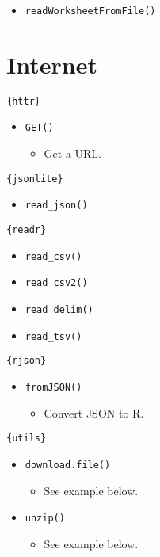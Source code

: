 \documentclass[
]{book}
\providecommand{\tightlist}{%
  \setlength{\itemsep}{0pt}\setlength{\parskip}{0pt}}
\begin{document}
\begin{itemize}
\tightlist
\item
  \texttt{readWorksheetFromFile()}
\end{itemize}

\hypertarget{internet}{%
\section{Internet}\label{internet}}

\texttt{\{httr\}}

\begin{itemize}
\tightlist
\item
  \texttt{GET()}

  \begin{itemize}
  \tightlist
  \item
    Get a URL.
  \end{itemize}
\end{itemize}

\texttt{\{jsonlite\}}

\begin{itemize}
\tightlist
\item
  \texttt{read\_json()}
\end{itemize}

\texttt{\{readr\}}

\begin{itemize}
\tightlist
\item
  \texttt{read\_csv()}
\item
  \texttt{read\_csv2()}
\item
  \texttt{read\_delim()}
\item
  \texttt{read\_tsv()}
\end{itemize}

\texttt{\{rjson\}}

\begin{itemize}
\tightlist
\item
  \texttt{fromJSON()}

  \begin{itemize}
  \tightlist
  \item
    Convert JSON to R.
  \end{itemize}
\end{itemize}

\texttt{\{utils\}}

\begin{itemize}
\tightlist
\item
  \texttt{download.file()}

  \begin{itemize}
  \tightlist
  \item
    See example below.
  \end{itemize}
\item
  \texttt{unzip()}

  \begin{itemize}
  \tightlist
  \item
    See example below.
  \end{itemize}
\end{itemize}
\end{document}
